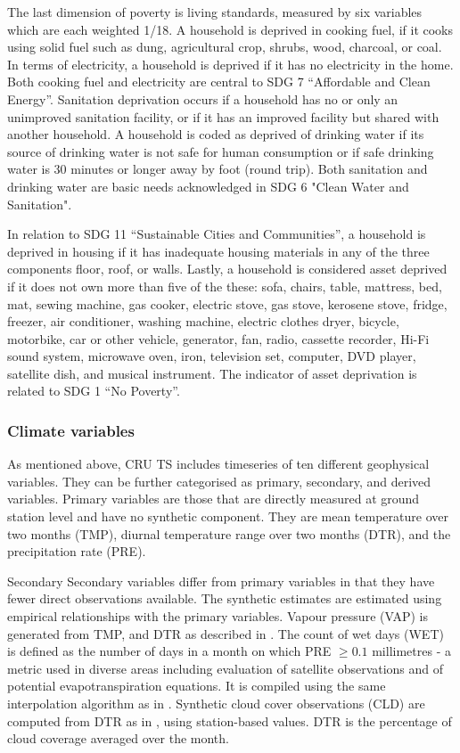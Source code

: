 \documentclass[a4paper,12pt]{article}
\theoremstyle{plain}
\theoremstyle{definition}
\theoremstyle{definition}
\theoremstyle{definition}
\theoremstyle{definition}
\begin{document}
The last dimension of poverty is living standards, measured by six variables which are each weighted 1/18. A household is deprived in cooking fuel, if it cooks using solid fuel such as dung, agricultural crop, shrubs, wood, charcoal, or coal. In terms of electricity, a household is deprived if it has no electricity in the home. Both cooking fuel and electricity are central to SDG 7 ``Affordable and Clean Energy''. Sanitation deprivation occurs if a household has no or only an unimproved sanitation facility, or if it has an improved facility but shared with another household. A household is coded as deprived of drinking water if its source of drinking water is not safe for human consumption or if safe drinking water is 30 minutes or longer away by foot (round trip). Both sanitation and drinking water are basic needs acknowledged in SDG 6 "Clean Water and Sanitation".

In relation to SDG 11 ``Sustainable Cities and Communities'', a household is deprived in housing if it has inadequate housing materials in any of the three components floor, roof, or walls. Lastly, a household is considered asset deprived if it does not own more than five of the these: sofa, chairs, table, mattress, bed, mat, sewing machine, gas cooker, electric stove, gas stove, kerosene stove, fridge, freezer, air conditioner, washing machine, electric clothes dryer, bicycle, motorbike, car or other vehicle, generator, fan, radio, cassette recorder, Hi-Fi sound system, microwave oven, iron, television set, computer, DVD player, satellite dish, and musical instrument. The indicator of asset deprivation is related to SDG 1 ``No Poverty''.

\subsubsection{Climate variables}
\label{subsub:climatevars}

As mentioned above, CRU TS includes timeseries of ten different geophysical variables. They can be further categorised as primary, secondary, and derived variables. Primary variables are those that are directly measured at ground station level and have no synthetic component. They are mean temperature over two months (TMP), diurnal temperature range  over two months (DTR), and the precipitation rate (PRE).

Secondary Secondary variables differ from primary variables in that they have fewer direct observations available. The synthetic estimates are estimated using empirical relationships with the primary variables. Vapour pressure (VAP) is generated from TMP, and DTR as described in \citet{harris2020}. The count of wet days (WET) is defined as the number of days in a month on which PRE $\geq0.1$ millimetres - a metric used in diverse areas including evaluation of satellite observations and of potential evapotranspiration equations. It is compiled using the same interpolation algorithm as in \citet{harris2014}. Synthetic cloud cover observations (CLD) are computed from DTR as in \citet{harris2014}, using station-based values. DTR is the percentage of cloud coverage averaged over the month.
\end{document}
